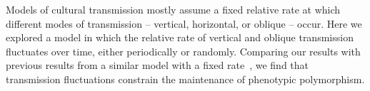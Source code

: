 \documentclass[12pt]{extarticle} %
\makeatletter
\renewcommand\section{\@startsection {section}{1}{\z@}%
     {-2.5ex \@plus -1ex \@minus -.2ex}%
     {1.3ex \@plus.2ex}%
    {\Large\bfseries}}
\makeatother
\begin{document}
Models of cultural transmission mostly assume a fixed relative rate at which different modes of transmission -- vertical, horizontal, or oblique -- occur.
Here we explored a model in which the relative rate of vertical and oblique transmission fluctuates over time, either periodically or randomly. 
Comparing our results with previous results from a similar model with a fixed rate~\citep{Ram2018}, we find that transmission fluctuations constrain the maintenance of phenotypic polymorphism.


%



%
\end{document}
